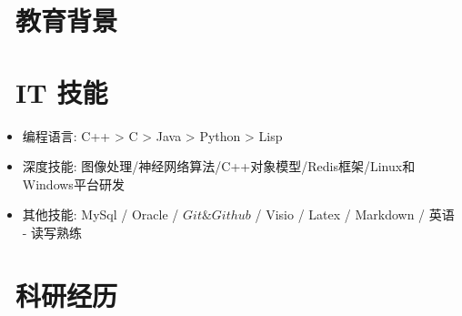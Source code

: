 \documentclass{resume}
\begin{document}


\section{\faGraduationCap\  教育背景}

\section{\faCogs\ IT 技能}
\begin{itemize}[parsep=0.5ex]
  \item 编程语言: C++ > C > Java > Python > Lisp
  \item 深度技能: 图像处理/神经网络算法/C++对象模型/Redis框架/Linux和Windows平台研发
  \item 其他技能: MySql / Oracle / $Git\& Github$ / Visio / Latex / Markdown / 英语 - 读写熟练
\end{itemize}

\section{\faUsers\ 科研经历}
\end{document}
